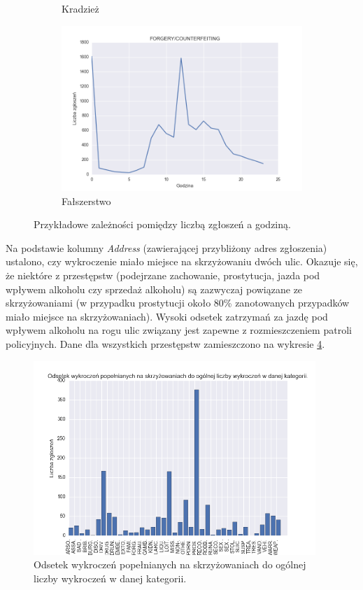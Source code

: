 \documentclass[11pt]{article} %
\begin{document}
\begin{figure}[h]
\begin{subfigure}{0.48\linewidth}
   \caption{Kradzież}
   \label{fig:crimes_per_hour_5} 
\end{subfigure}
\hfill
\begin{subfigure}{0.48\linewidth}
   \centering
   \includegraphics[width=\linewidth]{images/crimes_per_hour/12}
   \caption{Fałszerstwo}
   \label{fig:crimes_per_hour_6}
\end{subfigure}
\centering
\caption{Przykładowe zależności pomiędzy liczbą zgłoszeń a godziną.} 
\end{figure}

Na podstawie kolumny \textit{Address} (zawierającej przybliżony adres zgłoszenia) ustalono, czy wykroczenie miało miejsce na skrzyżowaniu dwóch ulic. Okazuje się, że niektóre z przestępstw (podejrzane zachowanie, prostytucja, jazda pod wpływem alkoholu czy sprzedaż alkoholu) są zazwyczaj powiązane ze skrzyżowaniami (w przypadku prostytucji około 80\% zanotowanych przypadków miało miejsce na skrzyżowaniach). Wysoki odsetek zatrzymań za jazdę pod wpływem alkoholu na rogu ulic związany jest zapewne z rozmieszczeniem patroli policyjnych. Dane dla wszystkich przestępstw zamieszczono na wykresie \ref{fig:corner}.

\begin{figure}[!h]
  \centering
    \includegraphics[width=0.95\textwidth]{images/street_corner}
  \caption{Odsetek wykroczeń popełnianych na skrzyżowaniach do ogólnej liczby wykroczeń w danej kategorii.} \label{fig:corner}
\end{figure}
\end{document}
